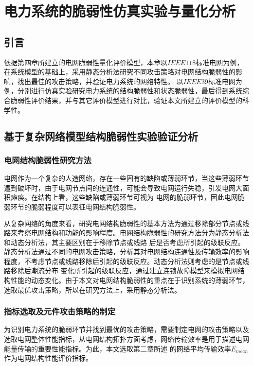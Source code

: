 \chapter{电力系统的脆弱性仿真实验与量化分析}
\label{cha:quantiAnaly}

\section{引言}
\label{sec:index5}
依据第四章所建立的电网脆弱性量化评价模型，本章以$IEEE118$标准电网为例，在系统模型的基础上，采用静态分析法研究不同攻击策略对电网结构脆弱性的影响，找出最佳的攻击策略，并验证电力系统的网络特性。
以$IEEE39$标准电网为例，分别进行仿真实验研究电力系统的结构脆弱性和状态脆弱性，最后得到系统综合脆弱性评价结果，并与其它评价模型进行对比，验证本文所建立的评价模型的科学性。
\section{基于复杂网络模型结构脆弱性实验验证分析}
\label{sec:modelIntroduce}

\subsection{电网结构脆弱性研究方法}
\label{sec:modelIntroduce}
电网作为一个复杂的人造网络，存在一些固有的缺陷或薄弱环节，当这些薄弱环节遭到破坏时，由于电网节点间的连通性，可能会导致电网运行失稳，引发电网大面积瘫痪。在结构上看，这些缺陷或薄弱环节可视为
电网的脆弱环节，因此电网脆弱环节的脆弱程度可以表征电网结构脆弱性。

从复杂网络的角度来看，研究电网结构脆弱性的基本方法为通过移除部分节点或线路来考察电网结构和功能的影响程度。电网结构脆弱性的研究方法分为静态分析法和动态分析法，其主要区别在于移除节点或线路
后是否考虑所引起的级联反应。静态分析法通过不同的电网攻击策略，分析其对电网结构连通性及传输效率的影响程度，不考虑节点或线路移除后引起的级联反应。动态分析法则考虑的是节点或线路移除后潮流分布
变化所引起的级联反应，通过建立连锁故障模型来模拟电网结构性能的动态变化。由于本文对电网结构脆弱性的重点在于识别系统的薄弱环节，选取最优攻击策略，所以在研究方法上，采用静态分析法。 

\subsection{指标选取及元件攻击策略的制定}
\label{sec:modelIntroduce}
为识别电力系统的脆弱环节并找到最优的攻击策略，需要制定电网的攻击策略以及选取电网整体性能指标，从电网结构拓扑方面考虑，网络传输效率是用于描述电网能量传输的重要性能指标。为此，本文选取第二章所述
的网络平均传输效率$E_{mean}$作为电网结构性能评价指标。

